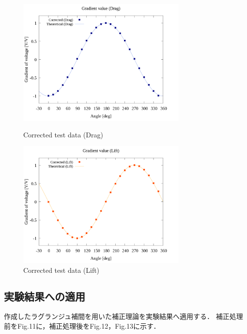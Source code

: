 \documentclass[twocolumn,a4j]{jsarticle}
\begin{document}
\begin{figure}[htbp]
    \footnotesize
    \begin{center}
        \includegraphics[width=85mm]{../../../02_workspace/result/simulation_tx=10.0_ty=-5.0_dx=5.00_dy=-2.50/plot/21/21-4_corrected_angle_drag.png}
        \caption{Corrected test data (Drag) }
        \includegraphics[width=85mm]{../../../02_workspace/result/simulation_tx=10.0_ty=-5.0_dx=5.00_dy=-2.50/plot/21/21-4_corrected_angle_lift.png}
        \caption{Corrected test data (Lift) }
    \end{center}
\end{figure}

\newpage

\subsection{実験結果への適用}

作成したラグランジュ補間を用いた補正理論を実験結果へ適用する．
補正処理前をFig.11に，補正処理後をFig.12，Fig.13に示す．
\end{document}
